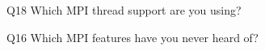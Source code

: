 \begin{description}%
\item{Q18} Which MPI thread support are you using?%
\item{Q16} Which MPI features have you never heard of?%
\end{description}%
